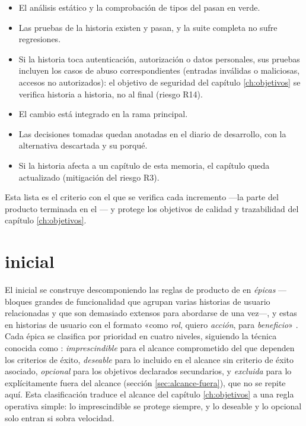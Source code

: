 \begin{itemize}
  \item El análisis estático y la comprobación de tipos del  pasan en verde.
  \item Las pruebas de la historia existen y pasan, y la suite completa no sufre regresiones.
  \item Si la historia toca autenticación, autorización o datos personales, sus pruebas incluyen los casos de abuso correspondientes (entradas inválidas o maliciosas, accesos no autorizados): el objetivo de seguridad del capítulo \ref{ch:objetivos} se verifica historia a historia, no al final (riesgo R14).
  \item El cambio está integrado en la rama principal.
  \item Las decisiones tomadas quedan anotadas en el diario de desarrollo, con la alternativa descartada y su porqué.
  \item Si la historia afecta a un capítulo de esta memoria, el capítulo queda actualizado (mitigación del riesgo R3).
\end{itemize}

Esta lista es el criterio con el que se verifica cada incremento —la parte del producto terminada en el — y protege los objetivos de calidad y trazabilidad del capítulo \ref{ch:objetivos}.

\section{ inicial}
\label{sec:backlog}

El  inicial se construye descomponiendo las reglas de producto de \bukit en \emph{épicas} —bloques grandes de funcionalidad que agrupan varias historias de usuario relacionadas y que son demasiado extensos para abordarse de una vez—, y estas en historias de usuario con el formato «como \emph{rol}, quiero \emph{acción}, para \emph{beneficio}» \parencite{cohn-user-stories}.
Cada épica se clasifica por prioridad en cuatro niveles, siguiendo la técnica conocida como  \parencite{clegg-moscow}: \emph{imprescindible} para el alcance comprometido del que dependen los criterios de éxito, \emph{deseable} para lo incluido en el alcance sin criterio de éxito asociado, \emph{opcional} para los objetivos declarados secundarios, y \emph{excluida} para lo explícitamente fuera del alcance (sección \ref{sec:alcance-fuera}), que no se repite aquí.
Esta clasificación traduce el alcance del capítulo \ref{ch:objetivos} a una regla operativa simple: lo imprescindible se protege siempre, y lo deseable y lo opcional solo entran si sobra velocidad.

